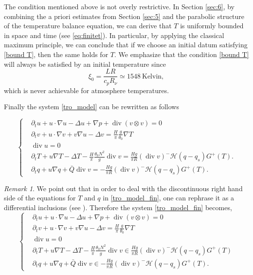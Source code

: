 \documentclass[11pt, a4paper, article,reqno,]{amsart}
\theoremstyle{remark}
\newtheorem{remark}[theorem]{Remark}
\DeclareMathOperator{\dive}{div}
\numberwithin{equation}{section}
\begin{document}
The condition mentioned above is not overly restrictive. In Section \ref{sec:6}, by combining the a priori estimates from Section \ref{sec:5} and the parabolic structure of the temperature balance equation, we can derive that $T$ is uniformly bounded in space and time (see \eqref{eq:finitet}). In particular, by applying the classical maximum principle, we can conclude that if we choose an initial datum satisfying \eqref{bound T}, then the same holds for $T$. We emphasize that the condition \eqref{bound T} will always be satisfied by an initial temperature since
$$ \xi_0 = \frac {LR}{c_pR_\nu}\simeq1548 \ \text{Kelvin},$$
which is never achievable for atmosphere temperatures.






 





Finally the system \eqref{tro_model} can be rewritten as follows

\begin{equation}\label{tro_model_fin}
     \left\{\begin{aligned}
&\partial_t u + u \cdot \nabla u - \Delta u + \nabla p + \dive (v \otimes v) = 0\\
& \partial_ t v + u \cdot \nabla v + v \nabla u - \Delta v = \frac{H}{\pi} \frac{g}{\theta_0} \nabla T \\
& \dive u = 0 \\
& \partial_t T + u \nabla T - \Delta T - \frac{H}{\pi}\frac{\theta_0 N^2}{g}  \dive v = \frac{H g}{\pi R}(\dive v)^- \mathcal{H}(q-q_s) G^+(T). \\
& \partial_t q + u \nabla q + \bar{Q} \dive v = -  \frac{H g}{\pi R}(\dive v)^- \mathcal{H}(q-q_s) G^+(T).
    \end{aligned}\right.
\end{equation}


\begin{remark}
    We point out that in order to deal with the discontinuous right hand side of the equations for $T$ and $q$ in  \eqref{tro_model_fin}, one can rephrase it as a differential inclusions (see \cite{CZ}). Therefore the system  \eqref{tro_model_fin} becomes,  
    \begin{equation}\label{tro_model_Te}
     \left\{\begin{aligned}
&\partial_t u + u \cdot \nabla u - \Delta u + \nabla p + \dive (v \otimes v) = 0\\
& \partial_ t v + u \cdot \nabla v + v \nabla u - \Delta v = \frac{H}{\pi} \frac{g}{\theta_0} \nabla T \\
& \dive u = 0 \\
& \partial_t T + u \nabla T - \Delta T -\frac{H}{\pi}\frac{\theta_0 N^2}{g} \dive v \in  \frac{H g}{\pi R}(\dive v)^- \mathcal{H}(q-q_s) G^+(T) \\
& \partial_t q + u \nabla q + \bar{Q} \dive v \in -  \frac{H g}{\pi R}(\dive v)^- \mathcal{H}(q-q_s) G^+(T).
    \end{aligned}\right.
\end{equation}
\end{remark}
\end{document}

